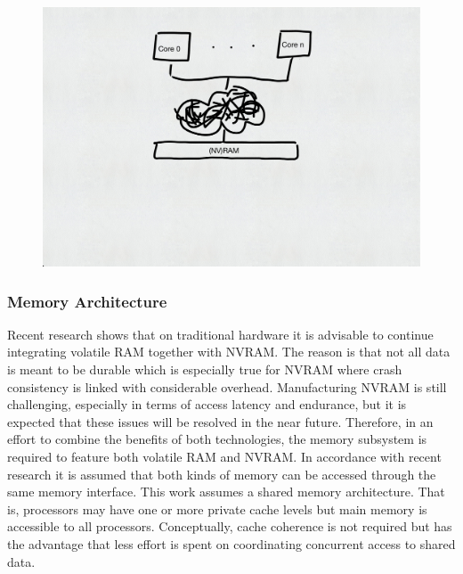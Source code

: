 
\begin{figure}[!ht]
    \centering
    \includegraphics[scale=0.5]{figures/drafts/concept-sys-cpu.pdf}
    \caption{}
    \label{fig:concept-sys-cpu}
\end{figure}

\subsubsection{Memory Architecture}

Recent research shows that on traditional hardware it is advisable to continue
integrating volatile RAM together with NVRAM. The reason is that not all data is
meant to be durable which is especially true for NVRAM where crash consistency
is linked with considerable overhead. Manufacturing NVRAM is still challenging,
especially in terms of access latency and endurance, but it is expected that
these issues will be resolved in the near future. Therefore, in an effort to
combine the benefits of both technologies, the memory subsystem is required to
feature both volatile RAM and NVRAM. In accordance with recent research it is
assumed that both kinds of memory can be accessed through the same memory
interface. This work assumes a shared memory architecture. That is, processors
may have one or more private cache levels but main memory is accessible to all
processors. Conceptually, cache coherence is not required but has the advantage
that less effort is spent on coordinating concurrent access to shared data.

